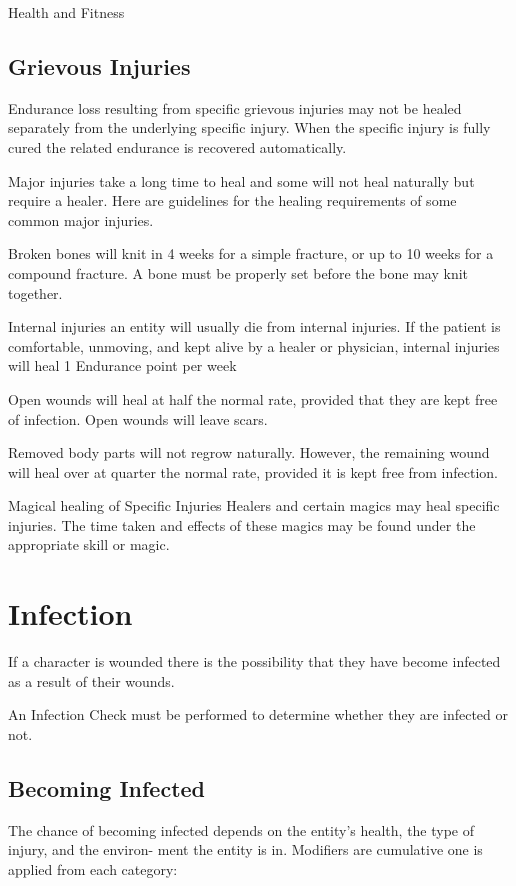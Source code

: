 \begin{Chapter}{Health and Fitness}
\subsection{Grievous Injuries}

Endurance loss resulting from specific grievous injuries may not be
healed separately from the underlying specific injury.  When the
specific injury is fully cured the related endurance is recovered
automatically.

Major injuries take a long time to heal and some will not heal
naturally but require a healer.  Here are guidelines for the healing
requirements of some common major injuries.

Broken bones will knit in 4 weeks for a simple fracture, or up to 10
weeks for a compound fracture.  A bone must be properly set before the
bone may knit together.

Internal injuries an entity will usually die from internal injuries.
If the patient is comfortable, unmoving, and kept alive by a healer or
physician, internal injuries will heal 1 Endurance point per week

Open wounds will heal at half the normal rate, provided that they are
kept free of infection. Open wounds will leave scars.

Removed body parts will not regrow naturally.  However, the remaining
wound will heal over at quarter the normal rate, provided it is kept
free from infection.

Magical healing of Specific Injuries Healers and certain magics may
heal specific injuries. The time taken and effects of these magics may
be found under the appropriate skill or magic.


\section{Infection}

If a character is wounded there is the possibility that they have
become infected as a result of their wounds.

An Infection Check must be performed to determine whether they are
infected or not.

\subsection{Becoming Infected}

The chance of becoming infected depends on the entity’s health, the
type of injury, and the environ- ment the entity is in. Modifiers are
cumulative one is applied from each category:


\end{Chapter}
